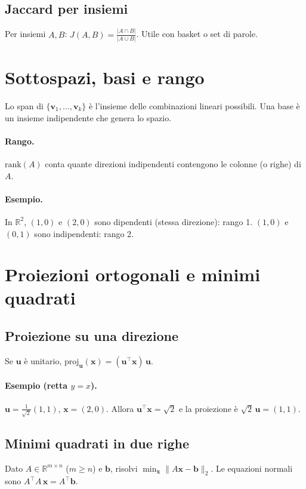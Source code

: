 \subsection{Jaccard per insiemi}
Per insiemi \(A,B\): \(J(A,B)=\tfrac{|A\cap B|}{|A\cup B|}\). Utile con basket o set di parole.

\section{Sottospazi, basi e rango}\label{sec:span-rank}
Lo span di \(\{\mathbf{v}_1,\dots,\mathbf{v}_k\}\) è l'insieme delle combinazioni lineari possibili. Una base è un insieme indipendente che genera lo spazio.
\paragraph{Rango.} \(\mathrm{rank}(A)\) conta quante direzioni indipendenti contengono le colonne (o righe) di \(A\).
\paragraph{Esempio.} In \(\mathbb{R}^2\), \((1,0)\) e \((2,0)\) sono dipendenti (stessa direzione): rango 1. \((1,0)\) e \((0,1)\) sono indipendenti: rango 2.

\section{Proiezioni ortogonali e minimi quadrati}\label{sec:proiezioni}
\subsection{Proiezione su una direzione}
Se \(\mathbf{u}\) è unitario, \(\mathrm{proj}_{\mathbf{u}}(\mathbf{x})=(\mathbf{u}^\top\mathbf{x})\,\mathbf{u}\).
\paragraph{Esempio (retta \(y=x\)).} \(\mathbf{u}=\tfrac{1}{\sqrt{2}}(1,1)\), \(\mathbf{x}=(2,0)\). Allora \(\mathbf{u}^\top\mathbf{x}=\sqrt{2}\) e la proiezione è \(\sqrt{2}\,\mathbf{u}=(1,1)\).
\subsection{Minimi quadrati in due righe}
Dato \(A\in\mathbb{R}^{m\times n}\) (\(m\ge n\)) e \(\mathbf{b}\), risolvi \(\min_{\mathbf{x}}\|A\mathbf{x}-\mathbf{b}\|_2\). Le equazioni normali sono \(A^\top A\,\mathbf{x}=A^\top\mathbf{b}\).
